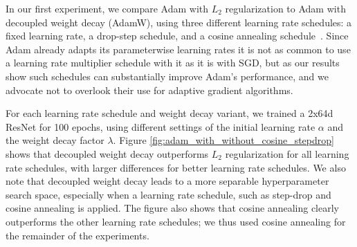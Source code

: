 \documentclass[usenames,dvipsnames]{article} %
\begin{document}
In our first experiment, we compare Adam with $L_2$ regularization to Adam with decoupled weight decay (AdamW), using three different learning rate schedules: a fixed learning rate, a drop-step schedule, and a cosine annealing schedule~\citep{loshchilov2016sgdr}.
Since Adam already adapts its parameterwise learning rates it is not as common to use a learning rate multiplier schedule with it as it is with SGD, but as our results show such schedules can substantially improve Adam's performance, and we advocate not to overlook their use for adaptive gradient algorithms. 

For each learning rate schedule and weight decay variant, we trained a 2x64d ResNet for 100 epochs, using different settings of the initial learning rate $\alpha$ and the weight decay factor $\lambda$. 
Figure \ref{fig:adam_with_without_cosine_stepdrop} shows that decoupled weight decay outperforms $L_2$ regularization for all 
learning rate schedules, with larger differences for better learning rate schedules. We also note that decoupled weight decay leads to a more separable hyperparameter search space, especially when a learning rate schedule, such as step-drop and cosine annealing is applied.
The figure also shows that cosine annealing clearly outperforms the other learning rate schedules; we thus used cosine annealing for the remainder of the experiments.
\end{document}
